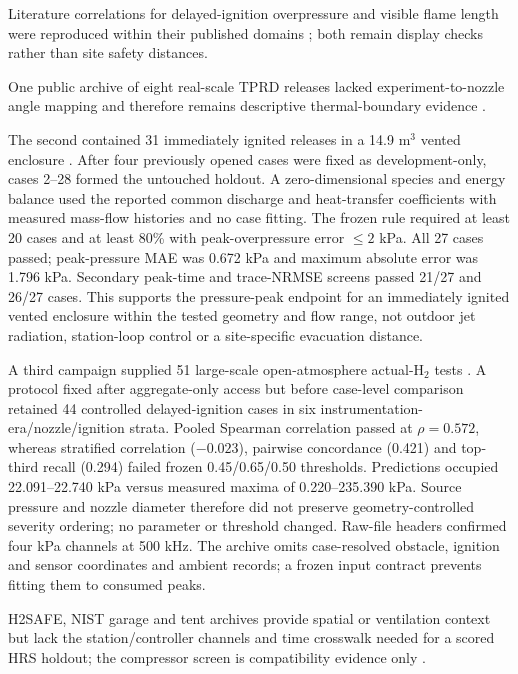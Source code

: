 \documentclass[12pt,a4paper]{article}
\begin{document}
Literature correlations for delayed-ignition overpressure and visible flame
length were reproduced within their published domains \cite{cirrone2022,molkov2011};
both remain display checks rather than site safety distances.

One public archive of eight real-scale TPRD releases lacked experiment-to-nozzle
angle mapping and therefore remains descriptive thermal-boundary evidence
\cite{lachgaathaug2022}.

The second contained 31 immediately ignited releases in a 14.9 m$^3$ vented
enclosure \cite{lach2021ignited}. After four previously opened cases were fixed
as development-only, cases 2--28 formed the untouched holdout. A zero-dimensional
species and energy balance used the reported common discharge and heat-transfer
coefficients with measured mass-flow histories and no case fitting. The frozen
rule required at least 20 cases and at least 80\% with peak-overpressure error
$\leq2$ kPa. All 27 cases passed; peak-pressure MAE was 0.672 kPa and maximum
absolute error was 1.796 kPa. Secondary peak-time and trace-NRMSE screens passed
21/27 and 26/27 cases. This supports the pressure-peak endpoint for an immediately
ignited vented enclosure within the tested geometry and flow range, not outdoor
jet radiation, station-loop control or a site-specific evacuation distance.

A third campaign supplied 51 large-scale open-atmosphere actual-H$_2$ tests
\cite{wskbij2026}. A protocol fixed after aggregate-only access but before
case-level comparison retained 44 controlled delayed-ignition cases in six
instrumentation-era/nozzle/ignition strata. Pooled Spearman correlation passed
at $\rho=0.572$, whereas stratified correlation ($-0.023$), pairwise concordance
(0.421) and top-third recall (0.294) failed frozen 0.45/0.65/0.50 thresholds.
Predictions occupied 22.091--22.740 kPa versus measured maxima of
0.220--235.390 kPa. Source pressure and nozzle diameter therefore did not
preserve geometry-controlled severity ordering; no parameter or threshold changed.
Raw-file headers confirmed four kPa channels at 500 kHz. The archive omits
case-resolved obstacle, ignition and sensor coordinates and ambient records; a
frozen input contract prevents fitting them to consumed peaks.

H2SAFE, NIST garage and tent archives provide spatial or ventilation context but
lack the station/controller channels and time crosswalk needed for a scored HRS
holdout; the compressor screen is compatibility evidence only
\cite{h2safe2026,pitts2011,korean_tent2026,mhc2025}.
\end{document}
